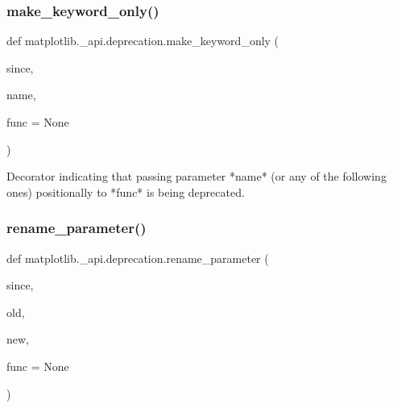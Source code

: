 \subsubsection{\texorpdfstring{make\+\_\+keyword\+\_\+only()}{make\_keyword\_only()}}
{\footnotesize\ttfamily def matplotlib.\+\_\+api.\+deprecation.\+make\+\_\+keyword\+\_\+only (\begin{DoxyParamCaption}\item[{}]{since,  }\item[{}]{name,  }\item[{}]{func = {\ttfamily None} }\end{DoxyParamCaption})}

\begin{DoxyVerb}Decorator indicating that passing parameter *name* (or any of the following
ones) positionally to *func* is being deprecated.
\end{DoxyVerb}
 \mbox{\label{namespacematplotlib_1_1__api_1_1deprecation_aa3f0c8301db6195d8340c71376926325}} 
\subsubsection{\texorpdfstring{rename\+\_\+parameter()}{rename\_parameter()}}
{\footnotesize\ttfamily def matplotlib.\+\_\+api.\+deprecation.\+rename\+\_\+parameter (\begin{DoxyParamCaption}\item[{}]{since,  }\item[{}]{old,  }\item[{}]{new,  }\item[{}]{func = {\ttfamily None} }\end{DoxyParamCaption})}

